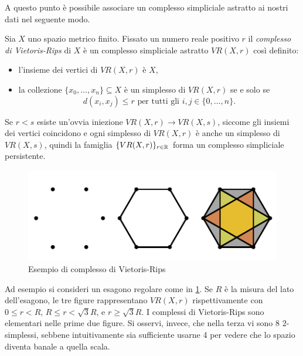 \begin{sloppypar}
  A questo punto è possibile associare un complesso simpliciale astratto ai nostri dati nel seguente modo.
\end{sloppypar}

\begin{definition}
  Sia $X$ uno spazio metrico finito. Fissato un numero reale positivo $r$ il \emph{complesso di Vietoris-Rips} di $X$ è
  un complesso simpliciale astratto $VR(X,r)$ così definito:
  \begin{itemize}
    \item l'insieme dei vertici di $VR(X,r)$ è $X$,
    \item la collezione $\{x_0,\dots,x_n\}\subseteq X$ è un simplesso di $VR(X,r)$ se e solo se
    \begin{equation*}
      d(x_i,x_j) \leq r \mathrm{\text{ per tutti gli }}i,j\in\{0,\dots,n\}.
    \end{equation*}
  \end{itemize}
\end{definition}

\begin{rmk}
  Se $r<s$ esiste un'ovvia iniezione $VR(X,r)\to VR(X,s)$, siccome gli insiemi dei vertici coincidono e ogni simplesso di $VR(X,r)$ è anche un simplesso di $VR(X,s)$, quindi la famiglia $\{VR(X,r)\}_{r\in\mathbb{R}}$ forma un complesso simpliciale persistente.
\end{rmk}

\begin{figure}[h]
  \includegraphics[width=.7\linewidth]{gfx/exhagon.pdf}
  \caption{Esempio di complesso di Vietoris-Rips}
  \label{fig:exhagon}
\end{figure}

Ad esempio si consideri un esagono regolare come in \cref{fig:exhagon}. Se $R$ è la misura del lato dell'esagono, le tre figure rappresentano $VR(X,r)$ rispettivamente con $0\leq r < R$, $R\leq r < \sqrt{3}R$, e $r \geq \sqrt{3}R$. I complessi di Vietoris-Rips sono elementari nelle prime due figure. Si osservi, invece, che nella terza vi sono 8 $2$-simplessi, sebbene intuitivamente sia sufficiente usarne 4 per vedere che lo spazio diventa banale a quella scala.

